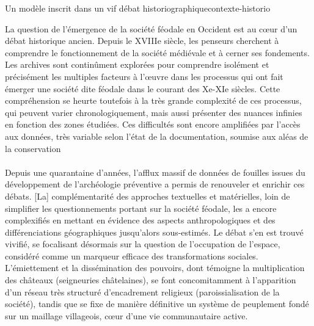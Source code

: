 \medskip 
\begin{encadre}{Un modèle inscrit dans un vif débat historiographique}{contexte-historio}
	
\noindent \og
La question de l'émergence de la société féodale en Occident est au cœur d'un débat historique ancien.
Depuis le XVIIIe siècle, les penseurs cherchent à comprendre le fonctionnement de la société médiévale et à cerner ses fondements.
Les archives sont continûment explorées pour comprendre isolément et précisément les multiples facteurs à l'œuvre dans les processus qui ont fait émerger une société dite \og féodale\fg{} dans le courant des Xe-XIe siècles.
Cette compréhension se heurte toutefois à la très grande complexité de ces processus, qui peuvent varier chronologiquement, mais aussi présenter des nuances infinies en fonction des zones étudiées.
Ces difficultés sont encore amplifiées par l'accès aux données, très variable selon l'état de la documentation, soumise aux aléas de la conservation \textelp{}
\paragraph[espace]{}
Depuis une quarantaine d'années, l'afflux massif de données de fouilles issues du développement de l'archéologie préventive a permis de renouveler et enrichir ces débats.\textelp{}
[La] complémentarité des approches textuelles et matérielles, loin de simplifier les questionnements portant sur la société féodale, les a encore complexifiés en mettant en évidence des aspects anthropologiques et des différenciations géographiques jusqu'alors sous-estimés.
Le débat s'en est trouvé vivifié, se focalisant désormais sur la question de l'occupation de l'espace, considéré comme un marqueur efficace des transformations sociales.
L'émiettement et la dissémination des pouvoirs, dont témoigne la multiplication des châteaux (seigneuries châtelaines), se font concomitamment à l'apparition d'un réseau très structuré d'encadrement religieux (paroissialisation de la société), tandis que se fixe de manière définitive un système de peuplement fondé sur un maillage villageois, cœur d'une vie communautaire active.


\end{encadre}
